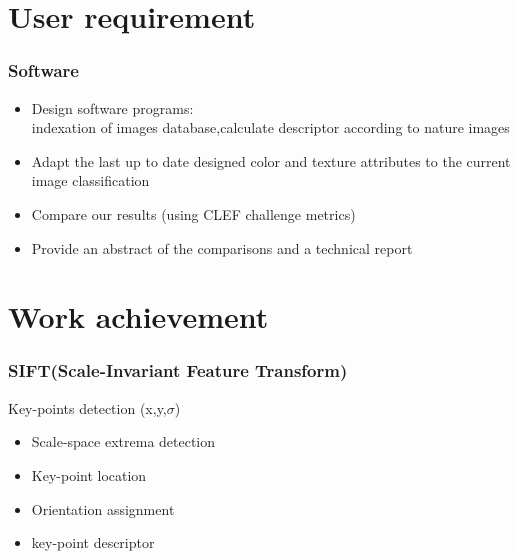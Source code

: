 \documentclass[xcolor=table]{beamer}
\begin{document}
\section{User requirement}
\begin{frame} \frametitle{Software}
\begin{itemize}
 \item Design  software programs:\\
   indexation of  images database,calculate descriptor according to  nature images
\item Adapt the last up to date designed color and texture attributes to the current image classification
\item Compare our results (using CLEF challenge metrics)
\item Provide an abstract of the comparisons and a technical report
\end{itemize}






\end{frame}

\section{Work achievement}
\begin{frame} \frametitle{SIFT(Scale-Invariant Feature Transform)}

Key-points detection (x,y,$\sigma$)
\begin{itemize}

\item Scale-space extrema detection\\


 \item  Key-point location\\


\item Orientation assignment\\


\item key-point descriptor 
\\

\end{itemize}
\end{frame}
\end{document}
